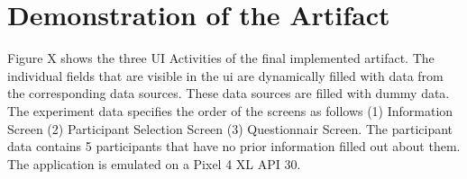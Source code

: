 \newpage\section{Demonstration of the Artifact}

Figure X shows the three UI Activities of the final implemented artifact. The individual fields that are visible in the \ac{ui} are dynamically filled with data from the corresponding data sources. These data sources are filled with dummy data. The experiment data specifies the order of the screens as follows (1) Information Screen (2) Participant Selection Screen (3) Questionnair Screen. The participant data contains 5 participants that have no prior information filled out about them. The application is emulated on a Pixel 4 XL API 30.

\begin{figure}[htbp]
    \centering
    \begin{subfigure}[b]{0.3\textwidth}
        \centering

\end{subfigure}
\end{figure}
